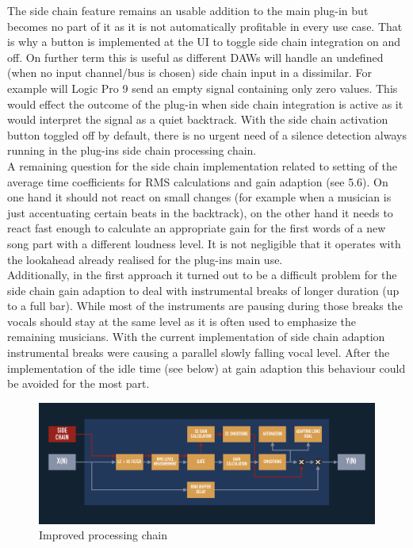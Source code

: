 The side chain feature remains an usable addition to the main plug-in but becomes no part of it as it is not automatically profitable in every use case. That is why a button is implemented at the UI to toggle side chain integration on and off. On further term this is useful as different DAWs will handle an undefined (when no input channel/bus is chosen) side chain input in a dissimilar. For example will Logic Pro 9 send an empty signal containing only zero values. This would effect the outcome of the plug-in when side chain integration is active as it would interpret the signal as a quiet backtrack. With the side chain activation button toggled off by default, there is no urgent need of a silence detection always running in the plug-ins side chain processing chain.\\
A remaining question for the side chain implementation related to setting of the average time coefficients for RMS calculations and gain adaption (see 5.6). On one hand it should not react on small changes (for example when a musician is just accentuating certain beats in the backtrack), on the other hand it needs to react fast enough to calculate an appropriate gain for the first words of a new song part with a different loudness level. It is not negligible that it operates with the lookahead already realised for the plug-ins main use.\\
Additionally, in the first approach it turned out to be a difficult problem for the side chain gain adaption to deal with instrumental breaks of longer duration (up to a full bar). While most of the instruments are pausing during those breaks the vocals should stay at the same level as it is often used to emphasize the remaining musicians. With the current implementation of side chain adaption instrumental breaks were causing a parallel slowly falling vocal level. After the implementation of the idle time (see below) at gain adaption this behaviour could be avoided for the most part.\\

\begin{figure}[H]
\includegraphics[width=\textwidth]{images/chain02}
\caption{Improved processing chain}
\end{figure}


